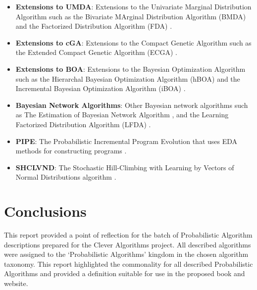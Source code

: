 \documentclass[a4paper, 11pt]{article}
\begin{document}
\begin{itemize}
	\item \textbf{Extensions to UMDA}: Extensions to the Univariate Marginal Distribution Algorithm such as the Bivariate MArginal Distribution Algorithm (BMDA) \cite{Pelikan1998, Pelikan1999} and the Factorized Distribution Algorithm (FDA) \cite{Muhlenbein1999}.
	\item \textbf{Extensions to cGA}: Extensions to the Compact Genetic Algorithm such as the Extended Compact Genetic Algorithm (ECGA) \cite{Harik1999a, Harik2006}.
	\item \textbf{Extensions to BOA}: Extensions to the Bayesian Optimization Algorithm such as the Hierarchal Bayesian Optimization Algorithm (hBOA) \cite{Pelikan2000, Pelikan2001b} and the Incremental Bayesian Optimization Algorithm (iBOA) \cite{Pelikan2008}.
	\item \textbf{Bayesian Network Algorithms}: Other Bayesian network algorithms such as The Estimation of Bayesian Network Algorithm \cite{Etxeberria1999}, and the Learning Factorized Distribution Algorithm (LFDA) \cite{Muehlenbein1999}.
	\item \textbf{PIPE}: The Probabilistic Incremental Program Evolution that uses EDA methods for constructing programs \cite{Salustowicz1997}. 
	\item \textbf{SHCLVND}: The Stochastic Hill-Climbing with Learning by Vectors of Normal Distributions algorithm \cite{Rudlof1996}.
\end{itemize}

% 
% 
\section{Conclusions}
\label{sec:conclusions}
This report provided a point of reflection for the batch of Probabilistic Algorithm descriptions prepared for the Clever Algorithms project. All described algorithms were assigned to the `Probabilistic Algorithms' kingdom in the chosen algorithm taxonomy. This report highlighted the commonality for all described Probabilistic Algorithms and provided a definition suitable for use in the proposed book and website.



\end{document}
